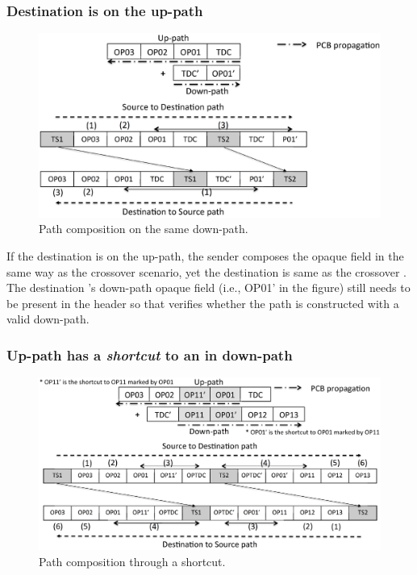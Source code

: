 \subsubsection{Destination \AD is on the up-path}

\begin{figure}[h]
\centering
\includegraphics[width=.9\columnwidth]{./fig/nex_fwd3.eps}
\caption{Path composition on the same down-path.}\label{fig:ex-fwd-onpath}
\end{figure}

\noindent If the destination \AD is on the up-path, the sender composes the opaque field in the same way as the crossover scenario, yet the destination \AD is same as the crossover \AD. The destination \AD's down-path opaque field (i.e., OP01' in the figure) still needs to be present in the header so that  verifies whether the path is constructed with a valid down-path.

\subsubsection{Up-path has a {\em shortcut} to an \AD in down-path}

\begin{figure}[h]
\centering
\includegraphics[width=.9\columnwidth]{./fig/nex_fwd4.eps}
\caption{Path composition through a shortcut.}\label{fig:ex-fwd-shortcut}
\end{figure}


